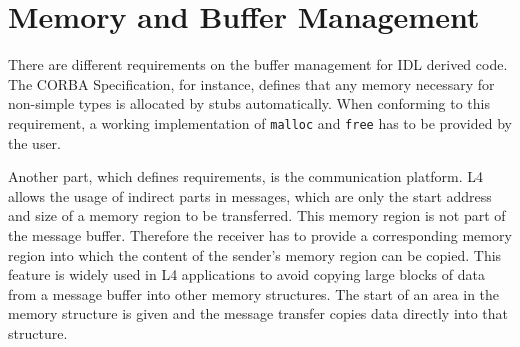 \section{Memory and Buffer Management}
\label{sec:mem-mgmt}

There are different requirements on the buffer management for IDL derived
code.  The CORBA Specification, for instance, defines that any memory
necessary for non-simple types is allocated by stubs automatically.  When
conforming to this requirement, a working implementation of \verb|malloc|
and \verb|free| has to be provided by the user.

Another part, which defines requirements, is the communication platform.
L4 allows the usage of indirect parts in messages, which are only the
start address and size of a memory region to be transferred.  This memory
region is not part of the message buffer.  Therefore the receiver has 
to provide a corresponding memory region into which the content of the
sender's memory region can be copied.  This feature is widely used in
L4 applications to avoid copying large blocks of data from a message buffer
into other memory structures.  The start of an area in the memory 
structure is given and the message transfer copies data directly into 
that structure.


